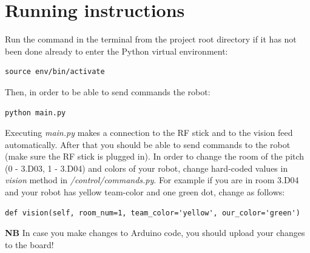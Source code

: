 \documentclass[12pt]{article}
\begin{document}
\section{Running instructions}

Run the command in the terminal from the project root directory if it has not been done already to enter the Python virtual environment:
\begin{lstlisting}
source env/bin/activate
\end{lstlisting}
Then, in order to be able to send commands the robot:
\begin{lstlisting}
python main.py
\end{lstlisting}
Executing \textit{main.py} makes a connection to the RF stick and to the vision feed automatically. After that you should be able to send commands to the robot (make sure the RF stick is plugged in).
In order to change the room of the pitch (0 - 3.D03, 1 - 3.D04) and colors of your robot, change hard-coded values in \textit{vision} method in \textit{/control/commands.py}. For example if you are in room 3.D04 and your robot has yellow team-color and one green dot, change as follows:
\begin{lstlisting}
def vision(self, room_num=1, team_color='yellow', our_color='green')
\end{lstlisting}
\bigskip

\textbf{NB} In case you make changes to Arduino code, you should upload your changes to the board!
\bigskip
\end{document}

